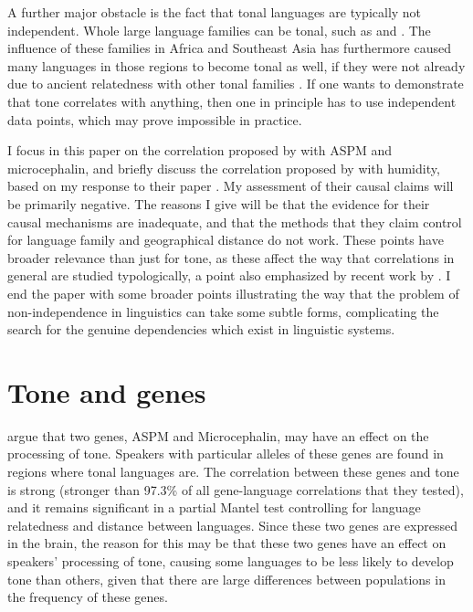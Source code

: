 \documentclass[output=paper]{langsci/langscibook}
\begin{document}
 A further major obstacle is the fact that tonal languages are typically not independent.  Whole large language families can be tonal, such as  and .  The influence of these families in Africa and Southeast Asia has furthermore caused many languages in those regions to become tonal as well, if they were not already due to ancient relatedness with other tonal families \citep{EnfieldAreal2005}.  If one wants to demonstrate that tone correlates with anything, then one in principle has to use independent data points, which may prove impossible in practice.



I focus in this paper on the correlation proposed by    \citeauthor{Dediu2007} with ASPM and microcephalin, and briefly discuss the correlation proposed by  \citeauthor{Everett2015} with humidity, based on my response to their paper \citep{CollinsInPress}. My assessment of their causal claims will be primarily negative.  The reasons I give will be that the evidence for their causal mechanisms are inadequate, and that the methods that they claim control for language family and geographical distance do not work.  These points have broader relevance than just for tone, as these affect the way that correlations in general are studied typologically, a point also emphasized by recent work by \citet{Ladd2015}. I end the paper with some broader points illustrating the way that the problem of non-independence in linguistics can take some subtle forms, complicating the search for the genuine dependencies which exist in linguistic systems.



\section{Tone and genes}



\citet{Dediu2007} argue that two genes, ASPM and Microcephalin, may have an effect on the processing of tone.  Speakers with particular alleles of these genes are found in regions where tonal languages are.  The correlation between these genes and tone is strong (stronger than 97.3\% of all gene-language correlations that they tested), and it remains significant in a partial Mantel test controlling for language relatedness and distance between languages.  Since these two genes are expressed in the brain, the reason for this may be that these two genes have an effect on speakers’ processing of tone, causing some languages to be less likely to develop tone than others, given that there are large differences between populations in the frequency of these genes.  
\end{document}
